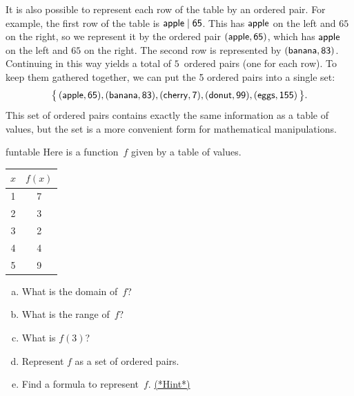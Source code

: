 It is also possible to represent each row of the table by an ordered pair. For example, the first row of the table is $\sf{apple} \mid 65$. 
This has $\sf{apple}$ on the left and $65$ on the right, so we represent it by the ordered pair $(\sf{apple}, 65)$, which has $\sf{apple}$ on the left and $65$ on the right. 
The second row is represented by $(\sf{banana}, 83)$. Continuing in this way yields a total of $5$~ordered pairs (one for each row). To keep them gathered together, we can put the 5 ordered pairs into a single set:
 \[ \bigl\{\, (\sf{apple}, 65), 
 (\sf{banana}, 83), 
 (\sf{cherry}, 7),
  (\sf{donut}, 99), 
  (\sf{eggs}, 155) \,\bigr\} . \]
  This set of ordered pairs contains exactly the same information as a table of values, but the set is a more convenient form for mathematical manipulations.

\begin{exercise}{funtable}
Here is a function~$f$ given by a table of values.

\begin{center}
\begin{tabular}{c|c}
$x$ & $f(x)$ \\ \hline

1 & 7 \\
2 & 3 \\
3 & 2 \\
4 & 4 \\
5 & 9 \\
\end{tabular}
\end{center}

\begin{enumerate}[(a)]
\item  \label{FunctionByTableEx-domain}
What is the domain of~$f$?
\item \label{FunctionByTableEx-range}
What is the range of~$f$? 
\item  \label{FunctionByTableEx-f(3)}
What is $f(3)$?
\item  \label{FunctionByTableEx-pairs}
Represent $f$ as a set of ordered pairs.
\item  \label{FunctionByTableEx-formula}
Find a formula to represent~$f$.
\hyperref[sec:functions:hints]{(*Hint*)}
\end{enumerate}
\end{exercise}

